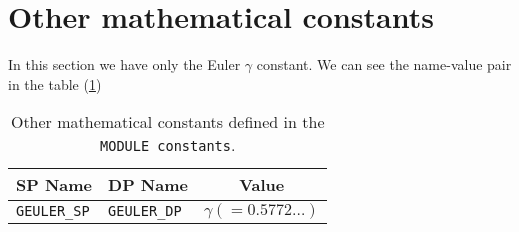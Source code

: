 \section{Other mathematical constants}

In this section we have only the Euler $\gamma$ constant. We can see
the name-value pair in the table (\ref{tab:other})

\begin{table}[htbp]
  \centering
  \begin{tabular}{|l|l|c|}
    \hline
    \textbf{SP Name} & \textbf{DP Name} & \textbf{Value} \\
    \hline
    \hline
    \texttt{GEULER\_SP} & \texttt{GEULER\_DP} & $\gamma (=0.5772\dots)$ \\
    \hline
  \end{tabular}
  \caption{Other mathematical constants defined in the \texttt{MODULE constants}.}
  \label{tab:other}
\end{table}
